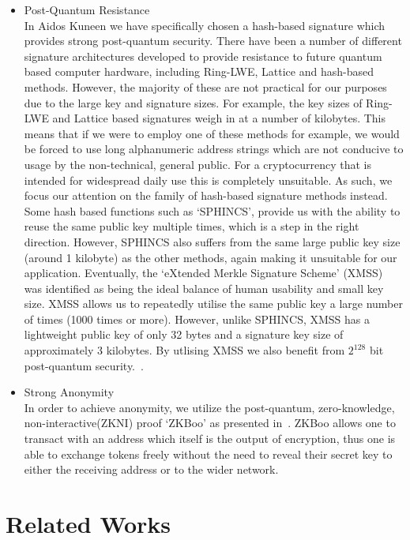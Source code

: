 \documentclass[a4paper,10pt,twocolumn]{article}
\begin{document}
\begin{itemize}
\item{Post-Quantum Resistance}\mbox{}\\ 
In Aidos Kuneen we have specifically chosen a hash-based signature which provides strong post-quantum security. There have been a 
number of different signature architectures developed to provide resistance to future quantum based computer hardware, including 
Ring-LWE, Lattice and hash-based methods. However, the majority of these are not practical for our purposes due to the large key and 
signature sizes. For example, the key sizes of Ring-LWE and Lattice based signatures weigh in at a number of kilobytes. This means that 
if we were to employ one of these methods for example, we would be forced to use long alphanumeric address strings which are not 
conducive to usage by the non-technical, general public. For a cryptocurrency that is intended for widespread daily use this is 
completely unsuitable. As such, we focus our attention on the family of hash-based signature methods instead. Some hash based functions 
such as `SPHINCS', provide us with the ability to reuse the same public key multiple times, which is a step in the right direction. 
However, SPHINCS also suffers from the same large public key size (around 1 kilobyte) as the other methods, again making it unsuitable 
for our application. Eventually, the `eXtended Merkle Signature Scheme' (XMSS) was identified as being the ideal balance of human 
usability and small key size. XMSS allows us to repeatedly utilise the same public key a large number of times (1000 times or more). 
However, unlike SPHINCS, XMSS has a lightweight public key of only 32 bytes and a signature key size of approximately 3 kilobytes. By utlising XMSS we also benefit from \( 2^{128} \) bit post-quantum security.~\cite{recom}.

\item{Strong Anonymity}\mbox{}\\ 
In order to achieve anonymity, we utilize the post-quantum, zero-knowledge, non-interactive(ZKNI) proof `ZKBoo' as presented 
in~\cite{zkboo}. ZKBoo allows one to transact with an address which itself is the output of encryption, thus one is able to exchange 
tokens freely without the need to reveal their secret key to either the receiving address or to the wider network.
\end{itemize}

\section{Related Works}
\end{document}
